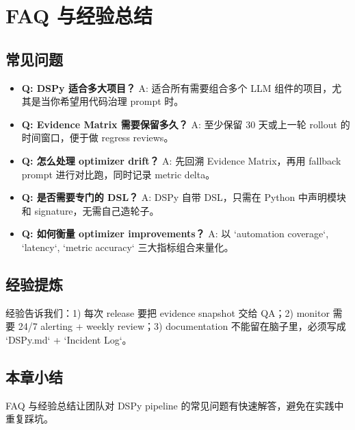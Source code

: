 \section{FAQ 与经验总结}

\subsection{常见问题}

\begin{itemize}
    \item \textbf{Q: DSPy 适合多大项目？} A: 适合所有需要组合多个 LLM 组件的项目，尤其是当你希望用代码治理 prompt 时。
    \item \textbf{Q: Evidence Matrix 需要保留多久？} A: 至少保留 30 天或上一轮 rollout 的时间窗口，便于做 regress reviews。
    \item \textbf{Q: 怎么处理 optimizer drift？} A: 先回溯 Evidence Matrix，再用 fallback prompt 进行对比跑，同时记录 metric delta。
    \item \textbf{Q: 是否需要专门的 DSL？} A: DSPy 自带 DSL，只需在 Python 中声明模块和 signature，无需自己造轮子。
    \item \textbf{Q: 如何衡量 optimizer improvements？} A: 以 `automation coverage`, `latency`, `metric accuracy` 三大指标组合来量化。
\end{itemize}

\subsection{经验提炼}

经验告诉我们：1) 每次 release 要把 evidence snapshot 交给 QA；2) monitor 需要 24/7 alerting + weekly review；3) documentation 不能留在脑子里，必须写成 `DSPy.md` + `Incident Log`。

\subsection{本章小结}

FAQ 与经验总结让团队对 DSPy pipeline 的常见问题有快速解答，避免在实践中重复踩坑。

